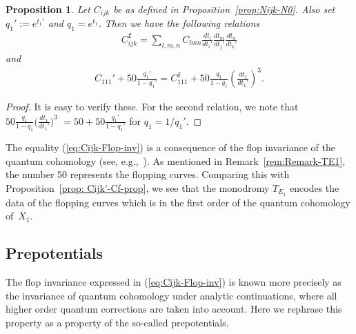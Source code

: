\documentclass[pdftex]{sigma}
\numberwithin{equation}{section}
\newtheorem{Proposition}[Theorem]{Proposition}
\begin{document}
\begin{Proposition}\label{prop:Yukawa-Reye}Let $C_{ijk}$ be as defined in Proposition~{\rm \ref{prop:Nijk-N0}}. Also set $q_{1}':=e^{t_{1}'}$ and $q_{1}=e^{t_{1}}$. Then we have the following relations
\begin{gather*}
C_{ijk}^{\mathtt{f}}=\sum_{l,m,n}C_{lmn}\frac{dt_{l}}{dt_{i}'}\frac{dt_{m}}{dt_{j}'}\frac{dt_{n}}{dt_{k}'}
\end{gather*}
and
\begin{gather}
C_{111}'+50\frac{q_{1}'}{1-q_{1}'}=C_{111}^{\mathtt{f}}+50\frac{q_{1}}{1-q_{1}}\left(\frac{dt_{1}}{dt_{1}'}\right)^{3}.\label{eq:Cijk-Flop-inv}
\end{gather}
\end{Proposition}
\begin{proof}It is easy to verify these. For the second relation, we note that $50\frac{q_{1}}{1-q_{1}}\big(\frac{dt_{1}}{dt_{1}'}\big)^{3}$
$=50+50\frac{q_{1}'}{1-q_{1}'}$ for $q_{1}=1/q_{1}'$.
\end{proof}

The equality (\ref{eq:Cijk-Flop-inv}) is a consequence of the flop invariance of the quantum cohomology (see, e.g.,~\cite{Iri,IriXia, LLWang}). As mentioned in Remark~\ref{rem:Remark-TE1}, the number 50 represents the flopping curves. Comparing this with Proposition~\ref{prop: Cijk'-Cf-prop}, we see that the monodromy $T_{E_{1}}$ encodes the data of the flopping curves which is in the first order of the quantum cohomology of~$X_{1}$.

\subsection{Prepotentials}

The flop invariance expressed in (\ref{eq:Cijk-Flop-inv}) is known more precisely as the invariance of quantum cohomology under analytic continuations, where all higher order quantum corrections are taken into account. Here we rephrase this property as a property of the so-called prepotentials.
\end{document}
